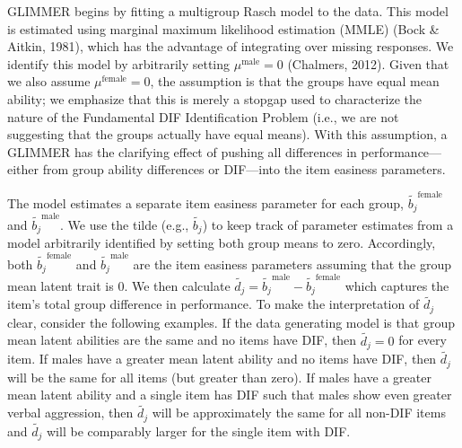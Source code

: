 \documentclass[
  english,
  man,floatsintext]{apa6}
\begin{document}
GLIMMER begins by fitting a multigroup Rasch model to the data. This model is estimated using marginal maximum likelihood estimation (MMLE) (Bock \& Aitkin, 1981), which has the advantage of integrating over missing responses. We identify this model by arbitrarily setting \(\mu^\text{male} = 0\) (Chalmers, 2012). Given that we also assume \(\mu^\text{female} = 0\), the assumption is that the groups have equal mean ability; we emphasize that this is merely a stopgap used to characterize the nature of the Fundamental DIF Identification Problem (i.e., we are not suggesting that the groups actually have equal means). With this assumption, a GLIMMER has the clarifying effect of pushing all differences in performance---either from group ability differences or DIF---into the item easiness parameters.

The model estimates a separate item easiness parameter for each group, \(\tilde {b_j}^\text{female}\) and \(\tilde {b_j}^\text{male}\). We use the tilde (e.g., \(\tilde {b_j}\)) to keep track of parameter estimates from a model arbitrarily identified by setting both group means to zero. Accordingly, both \(\tilde{b_j}^\text{female}\) and \(\tilde{b_j}^\text{male}\) are the item easiness parameters assuming that the group mean latent trait is \(0\). We then calculate \(\tilde{d_j} = \tilde {b_j}^\text{male} - \tilde {b_j}^\text{female}\) which captures the item's total group difference in performance. To make the interpretation of \(\tilde{d_j}\) clear, consider the following examples. If the data generating model is that group mean latent abilities are the same and no items have DIF, then \(\tilde{d_j} = 0\) for every item. If males have a greater mean latent ability and no items have DIF, then \(\tilde{d_j}\) will be the same for all items (but greater than zero). If males have a greater mean latent ability and a single item has DIF such that males show even greater verbal aggression, then \(\tilde{d_j}\) will be approximately the same for all non-DIF items and \(\tilde{d_j}\) will be comparably larger for the single item with DIF.
\end{document}
